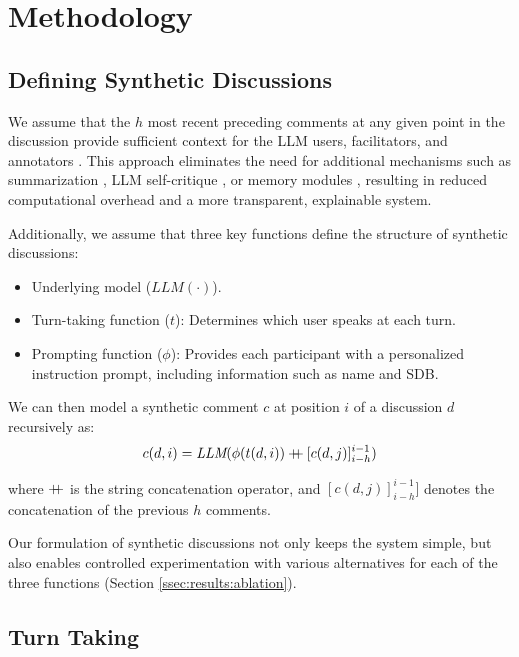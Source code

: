%

\section{Methodology}
\label{sec:methodology}

\subsection{Defining Synthetic Discussions}
\label{ssec:methodology:discussions}

We assume that the $h$ most recent preceding comments at any given point in the discussion provide sufficient context for the \ac{LLM} users, facilitators, and annotators \cite{pavlopoulos_2020_toxicity}. This approach eliminates the need for additional mechanisms such as summarization \cite{balog_2024}, \ac{LLM} self-critique \cite{yu_2024_fincon}, or memory modules \cite{Vezhnevets2023GenerativeAM}, resulting in reduced computational overhead and a more transparent, explainable system.

Additionally, we assume that three key functions define the structure of synthetic discussions:
\begin{itemize}[nosep, noitemsep]
    \item Underlying model ($\textit{LLM}(\cdot)$).
    \item Turn-taking function ($t$): Determines which user speaks at each turn.
    \item Prompting function ($\phi$): Provides each participant with a personalized instruction prompt, including information such as name and \ac{SDB}.
\end{itemize}

We can then model a synthetic comment $c$ at position $i$ of a discussion $d$ recursively as:
\begin{equation}
\label{eq:comment}
    c(d, i) = \textit{LLM}(\phi(t(d, i)) \mathbin{{+}\mspace{-8mu}{+}} [c(d, j)]^{i-1}_{i-h})
\end{equation}

\noindent where $\mathbin{{+}\mspace{-8mu}{+}}$ is the string concatenation operator, and $[c(d,j)]_{i-h}^{i-1}]$ denotes the concatenation of the previous $h$ comments.

Our formulation of synthetic discussions not only keeps the system simple, but also enables controlled experimentation with various alternatives for each of the three functions (Section \ref{ssec:results:ablation}).


\subsection{Turn Taking}
\label{ssec:methodology:turn}

